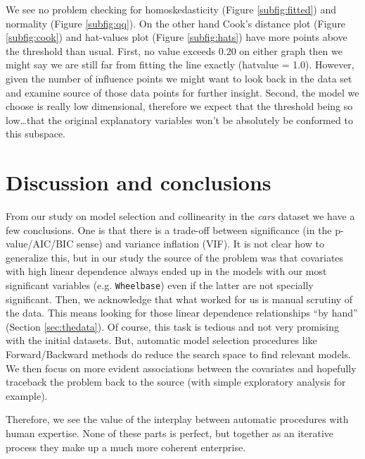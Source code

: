 \documentclass[12pt]{article}
\begin{document}
We see no problem checking for homoskedasticity (Figure \ref{subfig:fitted}) and normality (Figure \ref{subfig:qq}). On the other hand Cook's distance plot (Figure \ref{subfig:cook}) and hat-values
plot (Figure \ref{subfig:hats}) have more points above the threshold than usual. First, no value
exceeds 0.20 on either graph then we might say we are still far from fitting the line exactly (hatvalue = 1.0). However, given the number of influence points we might want to look back in the
data set and examine source of those data points for further insight.
Second, the model we choose is really low dimensional, therefore we expect that the threshold being
so low\ldots that the original explanatory variables won't be absolutely be conformed to this subspace.

\section{Discussion and conclusions}
From our study on model selection and collinearity in the \emph{cars} dataset we have a few conclusions. One is that there is a trade-off between significance (in the p-value/AIC/BIC sense) and
variance inflation (VIF). It is not clear how to generalize this, but in our study the source of the
problem was that covariates with high linear dependence always ended up in the models with our most significant variables (e.g. \texttt{Wheelbase}) even if the latter are not specially significant.
Then, we acknowledge that what worked for us is manual scrutiny of the data. This means looking for those linear dependence
relationships ``by hand'' (Section \ref{sec:thedata}). Of course, this task is tedious and not very promising with the initial datasets. But, automatic model selection procedures like Forward/Backward methods do reduce the search space to find relevant models. We then focus on more evident associations between the covariates and hopefully traceback the problem
back to the source (with simple exploratory analysis for example).

Therefore, we see the value of the interplay between automatic procedures with human expertise. None of these parts is
perfect, but together as an iterative process they make up a much more coherent enterprise.

\appendix
\end{document}
